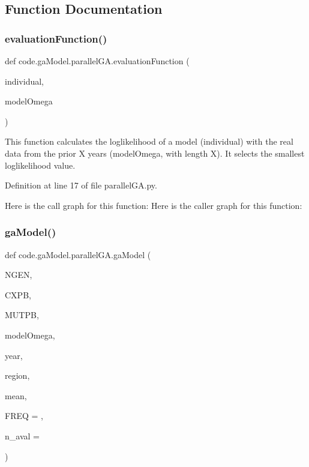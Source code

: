 \subsection{Function Documentation}
\mbox{\label{namespacecode_1_1ga_model_1_1parallel_g_a_aa9d1048007f567adaa88457299a1069e}} 
\subsubsection{\texorpdfstring{evaluation\+Function()}{evaluationFunction()}}
{\footnotesize\ttfamily def code.\+ga\+Model.\+parallel\+G\+A.\+evaluation\+Function (\begin{DoxyParamCaption}\item[{}]{individual,  }\item[{}]{model\+Omega }\end{DoxyParamCaption})}

\begin{DoxyVerb}This function calculates the loglikelihood of a model (individual) with 
the real data from the prior X years (modelOmega, with length X).
It selects the smallest loglikelihood value.
\end{DoxyVerb}
 

Definition at line 17 of file parallel\+G\+A.\+py.

Here is the call graph for this function\+:
Here is the caller graph for this function\+:
\mbox{\label{namespacecode_1_1ga_model_1_1parallel_g_a_a287be72055dc127ce0c97fdf02db9e04}} 
\subsubsection{\texorpdfstring{ga\+Model()}{gaModel()}}
{\footnotesize\ttfamily def code.\+ga\+Model.\+parallel\+G\+A.\+ga\+Model (\begin{DoxyParamCaption}\item[{}]{N\+G\+EN,  }\item[{}]{C\+X\+PB,  }\item[{}]{M\+U\+T\+PB,  }\item[{}]{model\+Omega,  }\item[{}]{year,  }\item[{}]{region,  }\item[{}]{mean,  }\item[{}]{F\+R\+EQ = {},  }\item[{}]{n\+\_\+aval = {} }\end{DoxyParamCaption})}

